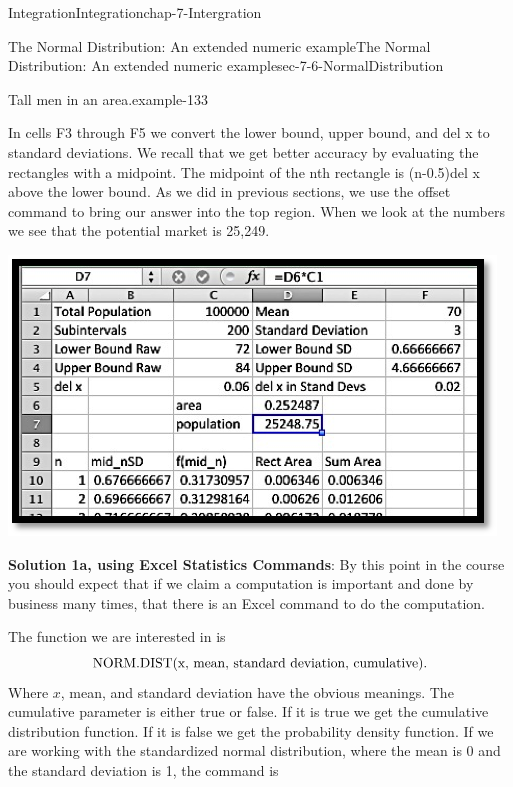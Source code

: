 \documentclass[oneside,10pt,]{book}
\newcommand{\terminology}[1]{\textbf{#1}}
\numberwithin{equation}{section}
\begin{document}
\begin{chapterptx}{Integration}{}{Integration}{}{}{chap-7-Intergration}
\begin{sectionptx}{The Normal Distribution: An extended numeric example}{}{The Normal Distribution: An extended numeric example}{}{}{sec-7-6-NormalDistribution}
\begin{example}{Tall men in an area.}{example-133}
\par
\hypertarget{p-2944}{}%
In cells F3 through F5 we convert the lower bound, upper bound, and del x to standard deviations.  We recall that we get better accuracy by evaluating the rectangles with a midpoint.  The midpoint of the nth rectangle is (n-0.5)\textasteriskcentered{}del x above the lower bound.  As we did in previous sections, we use the offset command to bring our answer into the top region.  When we look at the numbers we see that the potential market is 25,249.%
\begin{sidebyside}{1}{0.25}{0.25}{0}%
\begin{sbspanel}{0.5}%
\includegraphics[width=1\linewidth]{images/sec7-6-3.png}
\end{sbspanel}%
\end{sidebyside}%
\par
\hypertarget{p-2945}{}%
\terminology{Solution 1a, using Excel Statistics Commands}:  By this point in the course you should expect that if we claim a computation is important and done by business many times, that there is an Excel command to do the computation.%
\par
\hypertarget{p-2946}{}%
The function we are interested in is%
%
\begin{equation*}
\hbox{NORM.DIST(x, mean, standard deviation, cumulative).}
\end{equation*}
\hypertarget{p-2947}{}%
Where \(x\), mean, and standard deviation have the obvious meanings.  The cumulative parameter is either true or false.  If it is true we get the cumulative distribution function.  If it is false we get the probability density function.  If we are working with the standardized normal distribution, where the mean is 0 and the standard deviation is 1, the command is%
%
\begin{equation*}

\end{equation*}
\end{example}
\end{sectionptx}
\end{chapterptx}
\end{document}
